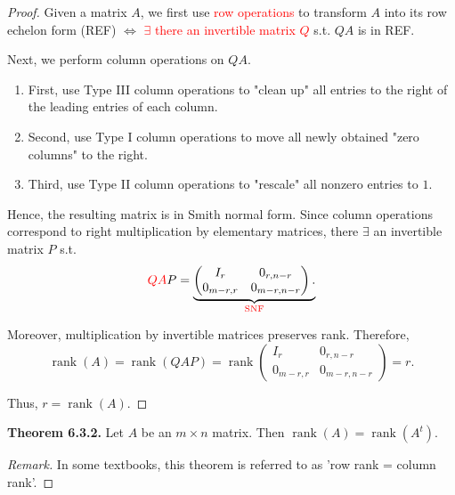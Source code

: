 \documentclass[12pt]{article}
\newenvironment{Remark}
{\begin{proof}[Remark]}
{\end{proof}}
\begin{document}
\begin{proof}
Given a matrix $A$, we first use \textcolor{red}{row operations} to transform $A$ into
its row echelon form (REF) $\Leftrightarrow$ \textcolor{red}{$\exists$ there  an invertible matrix
$Q$} s.t. $QA$ is in REF.

Next, we perform column operations on $QA$.

\begin{enumerate}
    \item First, use Type III column operations to "clean up" all
    entries to the right of the leading entries of each column.

    \item Second, use Type I column operations to move all newly
    obtained "zero columns" to the right.

    \item Third, use Type II column operations to "rescale" all nonzero
    entries to $1$.
\end{enumerate}

Hence, the resulting matrix is in Smith normal form. Since column
operations correspond to right multiplication by elementary matrices,
there $\exists$ an invertible matrix $P$ s.t.
\[
\textcolor{red}{QA}P
=
\underbrace{
\begin{pmatrix}
I_r & 0_{r,n-r}\\
0_{m-r,r} & 0_{m-r,n-r}
\end{pmatrix}.}_{\textcolor{red}{\text{SNF}}}
\]

Moreover, multiplication by invertible matrices preserves rank.
Therefore,
\[
\operatorname{rank}(A)
=
\operatorname{rank}(QAP)
=
\operatorname{rank}
\begin{pmatrix}
I_r & 0_{r,n-r}\\
0_{m-r,r} & 0_{m-r,n-r}
\end{pmatrix}
=
r.
\]

Thus, $r=\operatorname{rank}(A)$.
\end{proof}

\textbf{Theorem 6.3.2.}
Let $A$ be an $m\times n$ matrix. Then $\operatorname{rank}(A)=\operatorname{rank}(A^t)$.

\begin{Remark}
In some textbooks, this theorem is referred to as
'row rank = column rank'.
\end{Remark}
\end{document}
